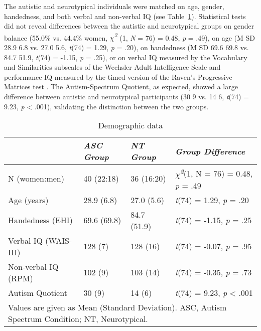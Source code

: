 The autistic and neurotypical individuals were matched on age, gender, handedness, and both verbal and non-verbal IQ (see Table~\ref{tab:ppt-stats-lang}). Statistical tests did not reveal differences between the autistic and neurotypical groups on gender balance (55.0\% vs. 44.4\% women, \textit{$\chi$\textsuperscript{2}} (1, \textit{N} = 76) = 0.48, \textit{p} = .49), on age (M \textpm{} SD 28.9 \textpm{} 6.8 vs. 27.0 \textpm{} 5.6, \textit{t}(74) = 1.29, \textit{p} = .20), on handedness (M \textpm{} SD 69.6 \textpm{} 69.8 vs. 84.7 \textpm{} 51.9, \textit{t}(74) = -1.15, \textit{p} = .25), or on verbal IQ measured by the Vocabulary and Similarities subscales of the Wechsler Adult Intelligence Scale \citep[128 \textpm{} 7 vs. 128 \textpm{} 16, \textit{t}(74) = -0.07, \textit{p} = .95]{wechsler1997} and performance IQ measured by the timed version of the Raven's Progressive Matrices test \citep[102 \textpm{} 9 vs. 103 \textpm{} 14, \textit{t}(74) = -0.35, \textit{p} = .73]{raven1989}. The Autism-Spectrum Quotient, as expected, showed a large difference between autistic and neurotypical participants (30 \textpm{} 9 vs. 14 \textpm{} 6, \textit{t}(74) = 9.23, \textit{p} <  .001), validating the distinction between the two groups.

\begin{table}[ht]
    \captionsetup{justification=raggedright, singlelinecheck=false, font = normal} %
    \setlength{\tabcolsep}{7.5pt} %
    \renewcommand{\arraystretch}{1.5} %
    \caption{Demographic data}
    \label{tab:ppt-stats-lang}
    \begin{tabular}{llll}
    \hline
    \textbf{} & \textit{ASC Group} & \textit{NT Group} & \textit{Group Difference} \\
    \hline
    N (women:men) & 40 (22:18) & 36 (16:20) & \textit{$\chi$\textsuperscript{2}}(1, N = 76) = 0.48, \textit{p} = .49 \\
    Age (years) & 28.9 (6.8) & 27.0 (5.6) & \textit{t}(74) = 1.29, \textit{p} = .20 \\
    Handedness (EHI) & 69.6 (69.8) & 84.7 (51.9) & \textit{t}(74) = -1.15, \textit{p} = .25 \\
    Verbal IQ (WAIS-III) & 128 (7) & 128 (16) & \textit{t}(74) = -0.07, \textit{p} = .95 \\
    Non-verbal IQ (RPM) & 102 (9) & 103 (14) & \textit{t}(74) = -0.35, \textit{p} = .73 \\
    Autism Quotient & 30 (9) & 14 (6) & \textit{t}(74) = 9.23, \textit{p} < .001 \\
    \hline
    \multicolumn{4}{l}{\footnotesize{Values are given as Mean (Standard Deviation). ASC, Autism Spectrum Condition; NT, Neurotypical.}} 
    \end{tabular}
\end{table}

